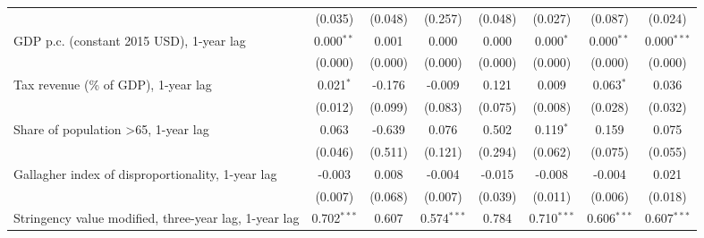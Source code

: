 \begin{table}[htbp]
\begin{tabular}{lccccccc}
                                                                                                 & (0.035)        & (0.048)                   & (0.257)        & (0.048)          & (0.027)         & (0.087)         & (0.024)\\   
      GDP p.c. (constant 2015 USD), 1-year lag                                                   & 0.000$^{**}$   & 0.001                     & 0.000          & 0.000            & 0.000$^{*}$     & 0.000$^{**}$    & 0.000$^{***}$\\   
                                                                                                 & (0.000)        & (0.000)                   & (0.000)        & (0.000)          & (0.000)         & (0.000)         & (0.000)\\   
      Tax revenue (\% of GDP), 1-year lag                                                        & 0.021$^{*}$    & -0.176                    & -0.009         & 0.121            & 0.009           & 0.063$^{*}$     & 0.036\\   
                                                                                                 & (0.012)        & (0.099)                   & (0.083)        & (0.075)          & (0.008)         & (0.028)         & (0.032)\\   
      Share of population >65, 1-year lag                                                        & 0.063          & -0.639                    & 0.076          & 0.502            & 0.119$^{*}$     & 0.159           & 0.075\\   
                                                                                                 & (0.046)        & (0.511)                   & (0.121)        & (0.294)          & (0.062)         & (0.075)         & (0.055)\\   
      Gallagher index of disproportionality, 1-year lag                                          & -0.003         & 0.008                     & -0.004         & -0.015           & -0.008          & -0.004          & 0.021\\   
                                                                                                 & (0.007)        & (0.068)                   & (0.007)        & (0.039)          & (0.011)         & (0.006)         & (0.018)\\   
      Stringency value modified, three-year lag, 1-year lag                                      & 0.702$^{***}$  & 0.607                     & 0.574$^{***}$  & 0.784            & 0.710$^{***}$   & 0.606$^{***}$   & 0.607$^{***}$\\   

\end{tabular}
\end{table}
